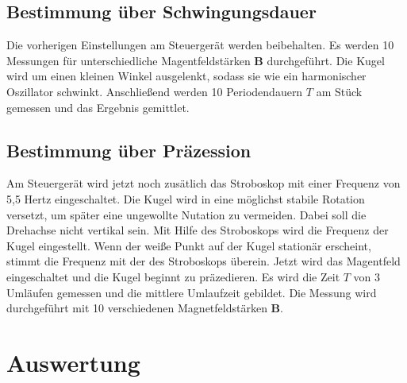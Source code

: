 \documentclass[
  bibliography=totoc,     %
  captions=tableheading,  %
  titlepage=firstiscover, %
]{scrartcl}
\begin{document}
  \subsection{Bestimmung über Schwingungsdauer}
    
    Die vorherigen Einstellungen am Steuergerät werden beibehalten.
    Es werden 10 Messungen für unterschiedliche Magentfeldstärken $\symbf{B}$ durchgeführt.
    Die Kugel wird um einen kleinen Winkel ausgelenkt, sodass sie wie ein harmonischer Oszillator schwinkt.
    Anschließend werden 10 Periodendauern $T$ am Stück gemessen und das Ergebnis gemittlet.
    
  \subsection{Bestimmung über Präzession}
    
    Am Steuergerät wird jetzt noch zusätlich das Stroboskop mit einer Frequenz von 5,5 Hertz eingeschaltet.
    Die Kugel wird in eine möglichst stabile Rotation versetzt, um später eine ungewollte Nutation zu vermeiden.
    Dabei soll die Drehachse nicht vertikal sein.
    Mit Hilfe des Stroboskops wird die Frequenz der Kugel eingestellt.
    Wenn der weiße Punkt auf der Kugel stationär erscheint, stimmt die Frequenz mit der des Stroboskops überein.
    Jetzt wird das Magentfeld eingeschaltet und die Kugel beginnt zu präzedieren.
    Es wird die Zeit $T$ von 3 Umläufen gemessen und die mittlere Umlaufzeit gebildet.
    Die Messung wird durchgeführt mit 10 verschiedenen Magnetfeldstärken $\symbf{B}$.


  \newpage
  \section{Auswertung}
\end{document}

